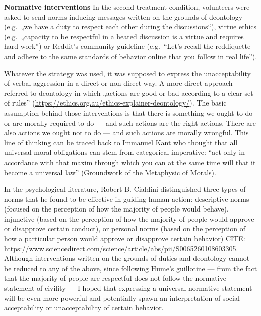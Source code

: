 \documentclass[
  10pt,
  dvipsnames,enabledeprecatedfontcommands]{scrartcl}
\begin{document}
\textbf{Normative interventions} In the second treatment condition,
volunteers were asked to send norms-inducing messages written on the
grounds of deontology (e.g.~„we have a duty to respect each other during
the discussions``), virtue ethics (e.g.~„capacity to be respectful in a
heated discussion is a virtue and requires hard work'') or Reddit's
community guideline (e.g.~``Let's recall the reddiquette and adhere to
the same standards of behavior online that you follow in real life'').

Whatever the strategy was used, it was supposed to express the
unacceptability of verbal aggression in a direct or non-direct way. A
more direct approach referred to deontology in which „actions are good
or bad according to a clear set of rules''
(\url{https://ethics.org.au/ethics-explainer-deontology/}). The basic
assumption behind those interventions is that there is something we
ought to do or are morally required to do --- and such actions are the
right actions. There are also actions we ought not to do --- and such
actions are morally wrongful. This line of thinking can be traced back
to Immanuel Kant who thought that all universal moral obligations can
stem from categorical imperative: ``act only in accordance with that
maxim through which you can at the same time will that it become a
universal law'' (Groundwork of the Metaphysic of Morals).

In the psychological literature, Robert B. Cialdini distinguished three
types of norms that he found to be effective in guiding human action:
descriptive norms (focused on the perception of how the majority of
people would behave), injunctive (based on the perception of how the
majority of people would approve or disapprove certain conduct), or
personal norms (based on the perception of how a particular person would
approve or disapprove certain behavior) CITE:
\url{https://www.sciencedirect.com/science/article/abs/pii/S0065260108603305}.
Although interventions written on the grounds of duties and deontology
cannot be reduced to any of the above, since following Hume's guillotine
--- from the fact that the majority of people are respectful does not
follow the normative statement of civility --- I hoped that expressing a
universal normative statement will be even more powerful and potentially
spawn an interpretation of social acceptability or unacceptability of
certain behavior.
\end{document}
